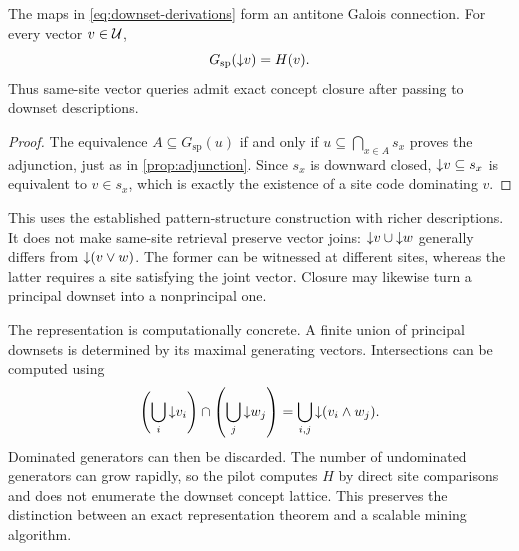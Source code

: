 \begin{theorem}
  \label{thm:spatial-context}
  The maps in \cref{eq:downset-derivations} form an antitone Galois
  connection. For every vector $v\in\mathcal{U}$,
  \begin{equation}\label{eq:principal-retrieval}
    G_{\mathrm{sp}}(\mathord{\downarrow} v)=H(v).
  \end{equation}
  Thus same-site vector queries admit exact concept closure after passing
  to downset descriptions.
\end{theorem}
\begin{proof}
  The equivalence $A\subseteq G_{\mathrm{sp}}(u)$ if and only if
  $u\subseteq\bigcap_{x\in A}s_{x}$ proves the adjunction, just as in
  \cref{prop:adjunction}. Since $s_{x}$ is downward closed,
  $\mathord{\downarrow} v\subseteq s_{x}$ is equivalent to $v\in s_{x}$, which is exactly
  the existence of a site code dominating $v$.
\end{proof}

This uses the established pattern-structure construction with richer
descriptions. It does not make same-site retrieval preserve vector joins:
$\mathord{\downarrow} v\cup\mathord{\downarrow} w$ generally differs from $\mathord{\downarrow}(v\vee w)$.
The former can be witnessed at different sites, whereas the latter
requires a site satisfying the joint vector. Closure may likewise turn
a principal downset into a nonprincipal one.

The representation is computationally concrete. A finite union of
principal downsets is determined by its maximal generating vectors.
Intersections can be computed using
\begin{equation}\label{eq:downset-intersection}
  \left(\bigcup_{i}\mathord{\downarrow} v_{i}\right)
  \cap\left(\bigcup_{j}\mathord{\downarrow} w_{j}\right)
  =\bigcup_{i,j}\mathord{\downarrow}(v_{i}\wedge w_{j}).
\end{equation}
Dominated generators can then be discarded. The number of undominated
generators can grow rapidly, so the pilot computes $H$ by direct site
comparisons and does not enumerate the downset concept lattice.
This preserves the distinction between an exact representation theorem
and a scalable mining algorithm.
